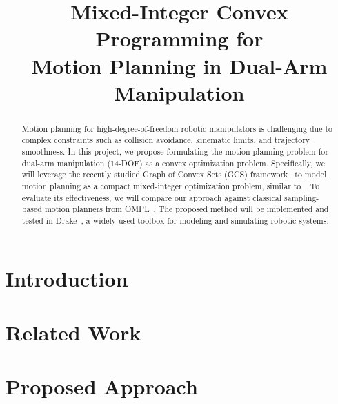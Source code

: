 \documentclass[conference]{IEEEtran}
\begin{document}
\title{Mixed-Integer Convex Programming for \\Motion Planning in Dual-Arm Manipulation}

\author{
}

\maketitle

\begin{abstract}
Motion planning for high-degree-of-freedom robotic manipulators is challenging due to complex constraints such as collision avoidance, kinematic limits, and trajectory smoothness.
%
In this project, we propose formulating the motion planning problem for dual-arm manipulation (14-DOF) as a convex optimization problem.
%
Specifically, we will leverage the recently studied Graph of Convex Sets (GCS) framework~\cite{marcucci2024shortest} to model motion planning as a compact mixed-integer optimization problem, similar to~\cite{marcucci2023motion}.
%
To evaluate its effectiveness, we will compare our approach against classical sampling-based motion planners from OMPL~\cite{sucan2012open}.
%
The proposed method will be implemented and tested in Drake~\cite{drake}, a widely used toolbox for modeling and simulating robotic systems.
\end{abstract}

\section{Introduction}

\section{Related Work}

\section{Proposed Approach}



\end{document}

